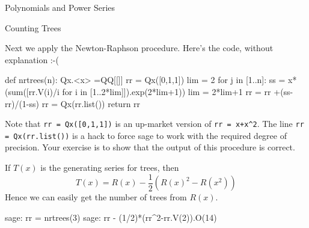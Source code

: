 \begin{chap}{Polynomials and Power Series}
\begin{sect}{Counting Trees}
\begin{para}
Next we apply the Newton-Raphson procedure.
Here's the code, without explanation :-(
\end{para}
%
\begin{sageblock}
def nrtrees(n):
    Qx.<x> =QQ[[]]
    rr = Qx([0,1,1])
    lim = 2
    for j in [1..n]:
        ss = x*(sum([rr.V(i)/i for i in [1..2*lim]]).exp(2*lim+1))
        lim = 2*lim+1
        rr = rr +(ss-rr)/(1-ss)
        rr = Qx(rr.list())
    return rr
\end{sageblock}
%
\begin{para}
Note that \verb|rr = Qx([0,1,1])| is an up-market version of \verb|rr = x+x^2|.
The line \verb|rr = Qx(rr.list())| is a hack to force sage to work with the
required degree of precision. Your exercise is to show that the output of this 
procedure is correct.
\end{para}
%
\begin{para}
If $T(x)$ is the generating series for trees, then
\[
    T(x) = R(x) -\frac12(R(x)^2-R(x^2))
\]
Hence we can easily get the number of trees from $R(x)$.
\end{para}
%
\begin{sageexample}
sage: rr = nrtrees(3)
sage: rr - (1/2)*(rr^2-rr.V(2)).O(14)
\end{sageexample}
%
\end{sect}
%
\end{chap}